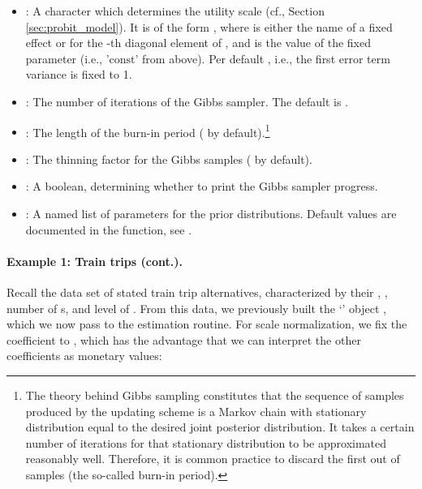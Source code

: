 \documentclass[article,shortnames]{jss}
\newcommand{\class}[1]{`\code{#1}'}
\newcommand{\fct}[1]{\code{#1()}}
\begin{document}
\begin{itemize}
  \item {}: A character which determines the utility scale (cf., Section \ref{sec:probit_model}). It is of the form , where  is either the name of a fixed effect or  for the -th diagonal element of , and  is the value of the fixed parameter (i.e., '$\text{const}$' from above). Per default , i.e., the first error term variance is fixed to 1.
  \item {}: The number of iterations of the Gibbs sampler. The default is .
  \item {}: The length of the burn-in period ( by default).\footnote{The theory behind Gibbs sampling constitutes that the sequence of samples produced by the
updating scheme is a Markov chain with stationary distribution equal to the desired joint posterior distribution. It takes a certain number of iterations for that stationary distribution to be approximated reasonably well. Therefore, it is common practice to discard the first  out of  samples (the so-called burn-in period).}
  \item {}: The thinning factor for the Gibbs samples ( by default).
  \item {}: A boolean, determining whether to print the Gibbs sampler progress.
  \item {}: A named list of parameters for the prior distributions. Default values are documented in the \fct{check\_prior} function, see .
\end{itemize}

\paragraph{Example 1: Train trips (cont.).}

Recall the  data set of stated train trip alternatives, characterized by their , , number of s, and level of . From this data, we previously built the \class{RprobitB\_data} object , which we now pass to the estimation routine. For scale normalization, we fix the  coefficient to , which has the advantage that we can interpret the other coefficients as monetary values:
\end{document}
